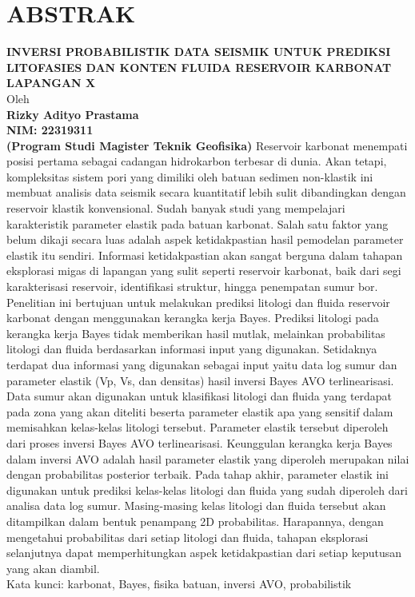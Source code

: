 \documentclass[main.tex]{subfiles}
\begin{document}
\singlespacing

\centering
\chapter*{ABSTRAK}
{\fontsize{14}{16.8}\selectfont \textbf{
    INVERSI PROBABILISTIK DATA SEISMIK UNTUK PREDIKSI LITOFASIES DAN KONTEN FLUIDA RESERVOIR KARBONAT LAPANGAN X\\
    }
    \vspace{1\baselineskip}
    Oleh\\
    \textbf{
    Rizky Adityo Prastama\\
    NIM: 22319311\\
    (Program Studi Magister Teknik Geofisika)
    }
}
\vspace{2\baselineskip}
\justify
\noindent
Reservoir karbonat menempati posisi pertama sebagai cadangan hidrokarbon
terbesar di dunia. Akan tetapi, kompleksitas sistem pori yang dimiliki oleh batuan
sedimen non-klastik ini membuat analisis data seismik secara kuantitatif lebih
sulit dibandingkan dengan reservoir klastik konvensional. Sudah banyak studi
yang mempelajari karakteristik parameter elastik pada batuan karbonat. Salah satu
faktor yang belum dikaji secara luas adalah aspek ketidakpastian hasil pemodelan
parameter elastik itu sendiri. Informasi ketidakpastian akan sangat berguna dalam
tahapan eksplorasi migas di lapangan yang sulit seperti reservoir karbonat, baik
dari segi karakterisasi reservoir, identifikasi struktur, hingga penempatan sumur
bor. Penelitian ini bertujuan untuk melakukan prediksi litologi dan fluida reservoir
karbonat dengan menggunakan kerangka kerja Bayes. Prediksi litologi pada
kerangka kerja Bayes tidak memberikan hasil mutlak, melainkan probabilitas
litologi dan fluida berdasarkan informasi input yang digunakan. Setidaknya
terdapat dua informasi yang digunakan sebagai input yaitu data log sumur dan
parameter elastik (Vp, Vs, dan densitas) hasil inversi Bayes AVO terlinearisasi.
Data sumur akan digunakan untuk klasifikasi litologi dan fluida yang terdapat
pada zona yang akan diteliti beserta parameter elastik apa yang sensitif dalam
memisahkan kelas-kelas litologi tersebut. Parameter elastik tersebut diperoleh dari
proses inversi Bayes AVO terlinearisasi. Keunggulan kerangka kerja Bayes dalam
inversi AVO adalah hasil parameter elastik yang diperoleh merupakan nilai
dengan probabilitas posterior terbaik. Pada tahap akhir, parameter elastik ini
digunakan untuk prediksi kelas-kelas litologi dan fluida yang sudah diperoleh dari
analisa data log sumur. Masing-masing kelas litologi dan fluida tersebut akan
ditampilkan dalam bentuk penampang 2D probabilitas. Harapannya, dengan
mengetahui probabilitas dari setiap litologi dan fluida, tahapan eksplorasi
selanjutnya dapat memperhitungkan aspek ketidakpastian dari setiap keputusan
yang akan diambil.\\

\noindent
Kata kunci: karbonat, Bayes, fisika batuan, inversi AVO, probabilistik
\end{document}
